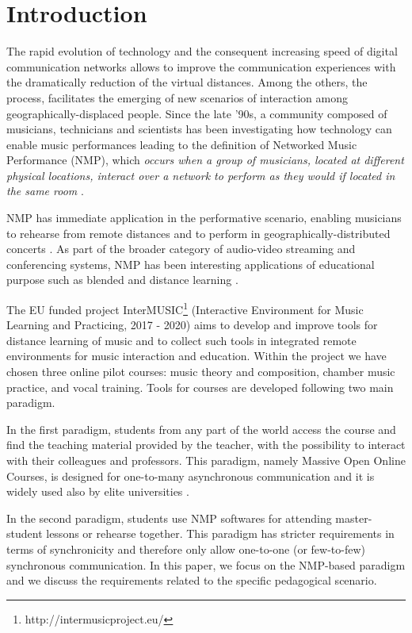 
\section{Introduction}\label{sec:introduction}

The rapid evolution of technology and the consequent increasing speed of digital communication networks allows to improve the communication experiences with the dramatically reduction of the virtual distances. Among the others, the process, facilitates the emerging of new scenarios of interaction among geogra\-phically-displaced people. Since the late '90s, a community composed of musicians, technicians and  scientists has been investigating how technology can enable music performances leading to the definition of Networked Music Performance (NMP), which \textit{occurs when a group of musicians, located at different physical locations, interact over a network to perform as they would if located in the same room} \cite{Lazzaro2001}.

NMP has immediate application in the performative scenario, enabling musicians to rehearse from remote distances and to perform in geographically-distributed concerts \cite{barbosa2003displaced}. As part of the broader category of audio-video streaming and conferencing systems, NMP has been interesting applications of educational purpose such as blended and distance learning \cite{IorwerthNMP2015}.    


The EU funded project InterMUSIC\footnote{http://intermusicproject.eu/} (Interactive Environment for Music Learning and Practicing, 2017 - 2020) aims to develop and improve tools for distance learning of music and to collect such tools in integrated remote environments for music interaction and education. Within the project we have chosen three online pilot courses: music theory and composition, chamber music practice, and vocal training. Tools for courses are developed following two main paradigm. %

In the first paradigm, students from any part of the world access the course and find the teaching material provided by the teacher, with the possibility to interact with their colleagues and professors. This paradigm, namely Massive Open Online Courses, is designed for one-to-many asynchronous communication and it is widely used also by elite universities \cite{MOOCS}.

In the second paradigm, students use NMP softwares for attending master-student lessons or rehearse together. This paradigm has stricter requirements in terms of synchronicity and therefore only allow one-to-one (or few-to-few) synchronous communication. In this paper, we focus on the NMP-based paradigm and we discuss the  requirements related to the specific pedagogical scenario.

